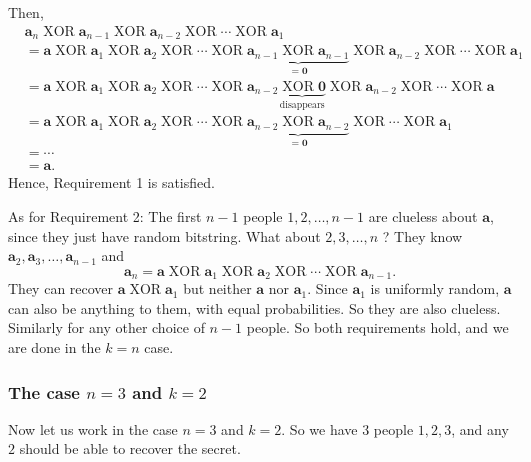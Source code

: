 \documentclass[numbers=enddot,12pt,final,onecolumn,notitlepage]{scrartcl}%
\numberwithin{exer}{section}
\theoremstyle{definition}
\begin{document}
Then,%
\begin{align*}
& \mathbf{a}_{n}\operatorname*{XOR}\mathbf{a}_{n-1}\operatorname*{XOR}%
\mathbf{a}_{n-2}\operatorname*{XOR}\cdots\operatorname*{XOR}\mathbf{a}_{1}\\
& =\mathbf{a}\operatorname*{XOR}\mathbf{a}_{1}\operatorname*{XOR}%
\mathbf{a}_{2}\operatorname*{XOR}\cdots\operatorname*{XOR}%
\underbrace{\mathbf{a}_{n-1}\operatorname*{XOR}\mathbf{a}_{n-1}}_{=\mathbf{0}%
}\operatorname*{XOR}\mathbf{a}_{n-2}\operatorname*{XOR}\cdots
\operatorname*{XOR}\mathbf{a}_{1}\\
& =\mathbf{a}\operatorname*{XOR}\mathbf{a}_{1}\operatorname*{XOR}%
\mathbf{a}_{2}\operatorname*{XOR}\cdots\operatorname*{XOR}\mathbf{a}%
_{n-2}\underbrace{\operatorname*{XOR}\mathbf{0}}_{\text{disappears}%
}\operatorname*{XOR}\mathbf{a}_{n-2}\operatorname*{XOR}\cdots
\operatorname*{XOR}\mathbf{a}\\
& =\mathbf{a}\operatorname*{XOR}\mathbf{a}_{1}\operatorname*{XOR}%
\mathbf{a}_{2}\operatorname*{XOR}\cdots\operatorname*{XOR}%
\underbrace{\mathbf{a}_{n-2}\operatorname*{XOR}\mathbf{a}_{n-2}}_{=\mathbf{0}%
}\operatorname*{XOR}\cdots\operatorname*{XOR}\mathbf{a}_{1}\\
& =\cdots\\
& =\mathbf{a}.
\end{align*}
Hence, Requirement 1 is satisfied.

As for Requirement 2: The first $n-1$ people $1,2,\ldots,n-1$ are clueless
about $\mathbf{a}$, since they just have random bitstring. What about
$2,3,\ldots,n$ ? They know $\mathbf{a}_{2},\mathbf{a}_{3},\ldots
,\mathbf{a}_{n-1}$ and%
\[
\mathbf{a}_{n}=\mathbf{a}\operatorname*{XOR}\mathbf{a}_{1}\operatorname*{XOR}%
\mathbf{a}_{2}\operatorname*{XOR}\cdots\operatorname*{XOR}\mathbf{a}_{n-1}.
\]
They can recover $\mathbf{a}\operatorname*{XOR}\mathbf{a}_{1}$ but neither
$\mathbf{a}$ nor $\mathbf{a}_{1}$. Since $\mathbf{a}_{1}$ is uniformly random,
$\mathbf{a}$ can also be anything to them, with equal probabilities. So they
are also clueless. Similarly for any other choice of $n-1$ people. So both
requirements hold, and we are done in the $k=n$ case.

\subsubsection{The case $n=3$ and $k=2$}

Now let us work in the case $n=3$ and $k=2$. So we have $3$ people $1,2,3$,
and any $2$ should be able to recover the secret.
\end{document}
